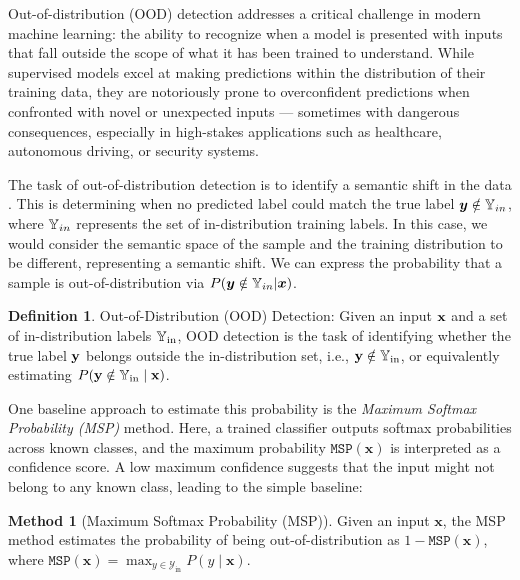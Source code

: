 \documentclass[11pt, oneside]{book}
\theoremstyle{plain}
\theoremstyle{definition}
\newtheorem{definition}[theorem]{Definition}
\newtheorem{method}[theorem]{Method}
\theoremstyle{remark}
\begin{document}
Out-of-distribution (OOD) detection addresses a critical challenge in modern machine learning: the ability to recognize when a model is presented with inputs that fall outside the scope of what it has been trained to understand. While supervised models excel at making predictions within the distribution of their training data, they are notoriously prone to overconfident predictions when confronted with novel or unexpected inputs — sometimes with dangerous consequences, especially in high-stakes applications such as healthcare, autonomous driving, or security systems.

The task of out-of-distribution detection is to identify a semantic shift in the data \citep{yang2021generalized}. This is determining when no predicted label could match the true label ${\bm{y}} \notin {\mathbb{Y}}_{in}$, where ${\mathbb{Y}}_{in}$ represents the set of in-distribution training labels. In this case, we would consider the semantic space of the sample and the training distribution to be different, representing a semantic shift. We can express the probability that a sample is out-of-distribution via $P({\bm{y}} \notin {\mathbb{Y}}_{in} | {\bm{x}})$. 

\begin{definition}
    Out-of-Distribution (OOD) Detection: Given an input ${\mathbf{x}}$ and a set of in-distribution labels ${\mathbb{Y}}_{\text{in}}$, OOD detection is the task of identifying whether the true label ${\mathbf{y}}$ belongs outside the in-distribution set, i.e., ${\mathbf{y}} \notin {\mathbb{Y}}_{\text{in}}$, or equivalently estimating $P({\mathbf{y}} \notin {\mathbb{Y}}_{\text{in}} \mid {\mathbf{x}})$.
    \label{defineood}
    \vspace{-2mm}
\end{definition}

One baseline approach to estimate this probability is the \textit{Maximum Softmax Probability (MSP)} method. Here, a trained classifier outputs softmax probabilities across known classes, and the maximum probability $\texttt{MSP}(\mathbf{x})$ is interpreted as a confidence score. A low maximum confidence suggests that the input might not belong to any known class, leading to the simple baseline:

\begin{method}[Maximum Softmax Probability (MSP)]
Given an input $\mathbf{x}$, the MSP method estimates the probability of being out-of-distribution as $1 - \texttt{MSP}(\mathbf{x})$, where $\texttt{MSP}(\mathbf{x}) = \max_{y \in \mathcal{Y}_{\text{in}}} P(y \mid \mathbf{x})$.
\label{methodmsp}
\end{method}
\end{document}
